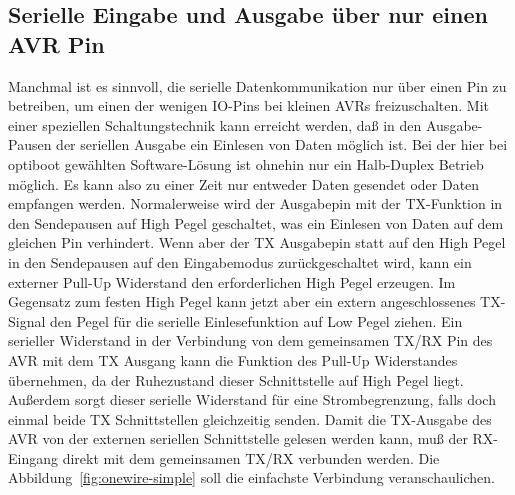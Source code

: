 \subsection{Serielle Eingabe und Ausgabe über nur einen AVR Pin}

Manchmal ist es sinnvoll, die serielle Datenkommunikation nur über einen Pin zu betreiben,
um einen der wenigen IO-Pins bei kleinen AVRs freizuschalten. 
Mit einer speziellen Schaltungstechnik kann erreicht werden, daß in den Ausgabe-Pausen
der seriellen Ausgabe ein Einlesen von Daten möglich ist.
Bei der hier bei optiboot gewählten Software-Lösung ist ohnehin nur ein Halb-Duplex Betrieb
möglich. Es kann also zu einer Zeit nur entweder Daten gesendet oder Daten empfangen werden.
Normalerweise wird der Ausgabepin mit der TX-Funktion in den Sendepausen auf High Pegel
geschaltet, was ein Einlesen von Daten auf dem gleichen Pin verhindert.
Wenn aber der TX Ausgabepin statt auf den High Pegel in den Sendepausen auf den Eingabemodus
zurückgeschaltet wird, kann ein externer Pull-Up Widerstand den erforderlichen High Pegel
erzeugen.
Im Gegensatz zum festen High Pegel kann jetzt aber ein extern angeschlossenes TX-Signal
den Pegel für die serielle Einlesefunktion auf Low Pegel ziehen.
Ein serieller Widerstand in der Verbindung von dem gemeinsamen TX/RX Pin
des AVR mit dem TX Ausgang kann die Funktion des Pull-Up Widerstandes übernehmen,
da der Ruhezustand dieser Schnittstelle auf High Pegel liegt.
Außerdem sorgt dieser serielle Widerstand für eine Strombegrenzung,
falls doch einmal beide TX Schnittstellen gleichzeitig senden.
Damit die TX-Ausgabe des AVR von der externen seriellen Schnittstelle gelesen werden kann,
muß der RX-Eingang direkt mit dem gemeinsamen TX/RX verbunden werden.
Die Abbildung~\ref{fig:onewire-simple} soll die einfachste Verbindung veranschaulichen.

